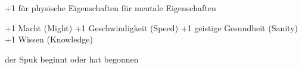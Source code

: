 
+1 für physische Eigenschaften
 \physicals {} für mentale Eigenschaften
 \mentals \mental

+1 Macht (Might) \might
+1 Geschwindigkeit (Speed) \speed
+1 geistige Gesundheit (Sanity) \sanity
+1 Wissen (Knowledge) \know

der Spuk beginnt oder hat begonnen
